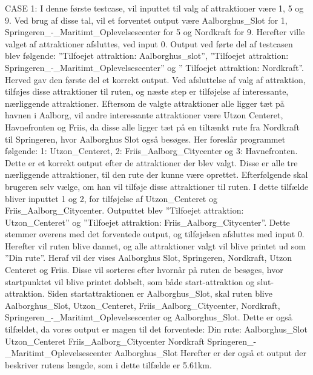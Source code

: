 CASE 1: 
I denne første testcase, vil inputtet til valg af attraktioner være 1, 5 og 9. Ved brug af disse tal, vil et forventet output være Aalborghus\_Slot for 1, Springeren\_-\_Maritimt\_Oplevelsescenter for 5 og Nordkraft for 9. Herefter ville valget af attraktioner afsluttes, ved input 0.
Output ved førte del af testcasen blev følgende: ”Tilfoejet attraktion: Aalborghus\_slot”, ”Tilfoejet attraktion: Springeren\_-\_Maritimt\_Oplevelsescenter” og ” Tilfoejet attraktion: Nordkraft”. Herved gav den første del et korrekt output. Ved afsluttelse af valg af attraktion, tilføjes disse attraktioner til ruten, og næste step er tilføjelse af interessante, nærliggende attraktioner. Eftersom de valgte attraktioner alle ligger tæt på havnen i Aalborg, vil andre interessante attraktioner være Utzon Centeret, Havnefronten og Friis, da disse alle ligger tæt på en tiltænkt rute fra Nordkraft til Springeren, hvor Aalborghus Slot også besøges.\newline
Her foreslår programmet følgende: 1: Utzon\_Centeret, 2: Friis\_Aalborg\_Citycenter og 3: Havnefronten. Dette er et korrekt output efter de attraktioner der blev valgt. Disse er alle tre nærliggende attraktioner, til den rute der kunne være oprettet. Efterfølgende skal brugeren selv vælge, om han vil tilføje disse attraktioner til ruten. I dette tilfælde bliver inputtet 1 og 2, for tilføjelse af Utzon\_Centeret og Friis\_Aalborg\_Citycenter. Outputtet blev ”Tilfoejet attraktion: Utzon\_Centeret” og ”Tilfoejet attraktion: Friis\_Aalborg\_Citycenter”. Dette stemmer overens med det forventede output, og tilføjelsen afsluttes med input 0. Herefter vil ruten blive dannet, og alle attraktioner valgt vil blive printet ud som ”Din rute”. Heraf vil der vises Aalborghus Slot, Springeren, Nordkraft, Utzon Centeret og Friis. Disse vil sorteres efter hvornår på ruten de besøges, hvor startpunktet vil blive printet dobbelt, som både start-attraktion og slut-attraktion. Siden startattraktionen er Aalborghus\_Slot, skal ruten blive Aalborghus\_Slot, Utzon\_Centeret, Friis\_Aalborg\_Citycenter, Nordkraft, Springeren\_-\_Maritimt\_Oplevelsescenter og Aalborghus\_Slot. Dette er også tilfældet, da vores output er magen til det forventede:\newline
Din rute:\newline
Aalborghus\_Slot\newline
Utzon\_Centeret\newline
Friis\_Aalborg\_Citycenter\newline
Nordkraft\newline
Springeren\_-\_Maritimt\_Oplevelsescenter\newline
Aalborghus\_Slot\newline
Herefter er der også et output der beskriver rutens længde, som i dette tilfælde er 5.61km.

